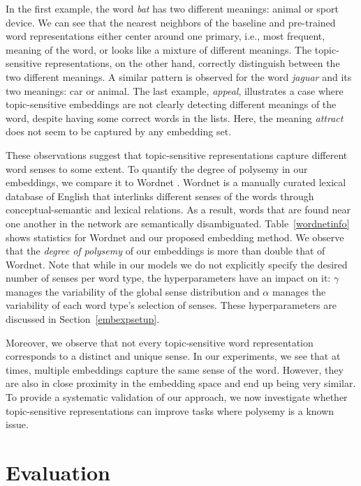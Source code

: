 In the first example, the word \textit{bat} has two different meanings: animal or sport device. We can see that the nearest neighbors of the baseline and pre-trained word representations either center around one primary, i.e., most frequent, meaning of the word, or looks like a mixture of different meanings. 
The topic-sensitive representations, on the other hand, correctly distinguish between the two different meanings. A similar pattern is observed for the word \textit{jaguar} and its two meanings: car or animal.
%
The last example, \textit{appeal}, illustrates a case where topic-sensitive embeddings are not clearly detecting different meanings of the word, despite having some correct words in the lists. %
Here, the meaning \textit{attract} does not seem to be captured by any embedding set. 

These observations suggest that topic-sensitive representations capture different word senses to some extent.
To quantify the degree of polysemy in our embeddings, we compare it to Wordnet \citep{miller1995wordnet}. 
Wordnet is a manually curated lexical database of English that interlinks different senses of the words through conceptual-semantic and lexical relations.
As a result, words that are found near one another in the network are semantically disambiguated. 
Table~\ref{wordnetinfo} shows statistics for Wordnet and our proposed embedding method.
We observe that the \textit{degree of polysemy} of our embeddings is more than double that of Wordnet.
Note that while in our models we do not explicitly specify the desired number of senses per word type, the hyperparameters have an impact on it: $\gamma$ manages the variability of the global sense distribution and $\alpha$ manages the variability of each word type's selection of senses. These hyperparameters are discussed in Section~\ref{embexpsetup}.

Moreover, we observe that not every topic-sensitive word representation corresponds to a distinct and unique sense. 
In our experiments, we see that at times, multiple embeddings capture the same sense of the word.
However, they are also in close proximity in the embedding space and end up being very similar.
To provide a systematic validation of our approach, we now investigate whether topic-sensitive representations can improve tasks where polysemy is a known issue. 


\section{Evaluation} \label{embevaluationsec}

